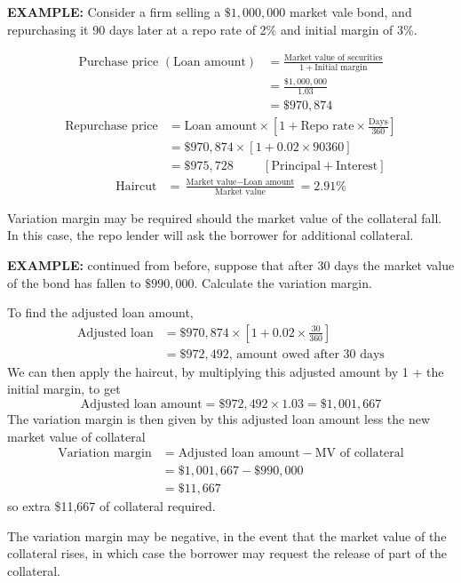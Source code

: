 \documentclass[../notes_compiled.tex]{subfiles}
\begin{document}
\begin{itemize}
{\color{RedViolet}
\item[] \textbf{EXAMPLE:} Consider a firm selling a $\$1,000,000$ market vale bond, and repurchasing it 90 days later at a repo rate of 2\% and initial margin of 3\%.
}
{\color{RoyalBlue}
\begin{align*}
\text{Purchase price } (\text{Loan amount}) &= \frac{\text{Market value of securities}}{1+\text{Initial margin}} \\
&=\frac{\$1,000,000}{1.03} \\
&=\$970,874
\end{align*}
\begin{align*}
\text{Repurchase price} &= \text{Loan amount} \times \left[ 1+\text{Repo rate}\times\frac{\text{Days}}{360}\right] \\
&=\$970,874 \times \left[ 1+0.02\times{90}{360}\right] \\
&=\$975,728 \hspace{1cm} \left[\text{Principal} + \text{Interest}\right]
\end{align*}
\begin{align*}
\text{Haircut} &= \frac{\text{Market value} - \text{Loan amount}}{\text{Market value}} = 2.91\%
\end{align*}
}
\item Variation margin may be required should the market value of the collateral fall. In this case, the repo lender will ask the borrower for additional collateral.
{\color{RedViolet}
\item[] \textbf{EXAMPLE:} continued from before, suppose that after 30 days the market value of the bond has fallen to $\$990,000$. Calculate the variation margin.
}
{\color{RoyalBlue}
\item[] To find the adjusted loan amount,
\begin{align*}
\text{Adjusted loan} &= \$970,874 \times \left[ 1+0.02\times\frac{30}{360}\right] \\
&= \$972,492\text{, amount owed after 30 days}
\end{align*}
We can then apply the haircut, by multiplying this adjusted amount by 1 + the initial margin, to get
\begin{equation*}
\text{Adjusted loan amount} = \$972,492 \times 1.03 = \$1,001,667
\end{equation*}
The variation margin is then given by this adjusted loan amount less the new market value of collateral
\begin{align*}
\text{Variation margin} &=\text{Adjusted loan amount} - \text{MV of collateral} \\
&=\$1,001,667 - \$990,000 \\
&=\$11,667
\end{align*}
so extra \$11,667 of collateral required.
}
\item[] The variation margin may be negative, in the event that the market value of the collateral rises, in which case the borrower may request the release of part of the collateral.

\end{itemize}
\end{document}
